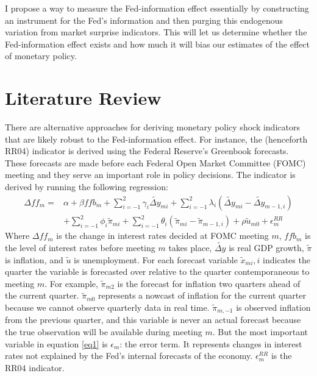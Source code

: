 \documentclass[a4paper,man,floatsintext,natbib]{apa6}
\begin{document}
	I propose a way to measure the Fed-information effect essentially by constructing an instrument for the Fed's information and then purging this endogenous variation from market surprise indicators. This will let us determine whether the Fed-information effect exists and how much it will bias our estimates of the effect of monetary policy.
	
	\section{Literature Review}
	There are alternative approaches for deriving monetary policy shock indicators that are likely robust to the Fed-information effect. For instance, the \citeauthor{Romer2004} (henceforth RR04) indicator is derived using the Federal Reserve's Greenbook forecasts. These forecasts are made before each Federal Open Market Committee (FOMC) meeting and they serve an important role in policy decisions. The indicator is derived by running the following regression: 
	\begin{align*}
		\Delta ff_m = &\alpha + \beta ffb_m + \sum_{i=-1}^{2} \gamma_i \widetilde{\Delta y}_{mi} + \sum^2_{i=-1} \lambda_i \left(\widetilde{\Delta y}_{mi}-\widetilde{\Delta y}_{m-1,i}\right) \tag{1} \label{eq1}\\
		&+\sum^{2}_{i=-1} \phi_i \tilde{\pi}_{mi} + \sum^2_{i=-1} \theta_i \left(\tilde{ \pi}_{mi}-\tilde{ \pi}_{m-1,i}\right) + \rho \tilde{u}_{m0} + \epsilon^{RR}_m
	\end{align*}
	Where \(\Delta ff_m\) is the change in interest rates decided at FOMC meeting \(m\), \(ffb_m\) is the level of interest rates before meeting \(m\) takes place, \(\widetilde{\Delta y}\) is real GDP growth, \(\tilde{\pi}\) is inflation, and \(\tilde{u}\) is unemployment. For each forecast variable \(\tilde{x}_{mi}, i\) indicates the quarter the variable is forecasted over relative to the quarter contemporaneous to meeting \(m\). For example, \(\tilde{\pi}_{m2}\) is the forecast for inflation two quarters ahead of the current quarter. \(\tilde{\pi}_{m0}\) represents a nowcast of inflation for the current quarter because we cannot observe quarterly data in real time. \(\tilde{\pi}_{m,-1}\) is observed inflation from the previous quarter, and this variable is never an actual forecast because the true observation will be available during meeting \(m\). But the most important variable in equation \ref{eq1} is \(\epsilon_m\):  the error term. It represents changes in interest rates not explained by the Fed's internal forecasts of the economy. \(\epsilon^{RR}_m\) is the RR04 indicator. \\
\end{document}
